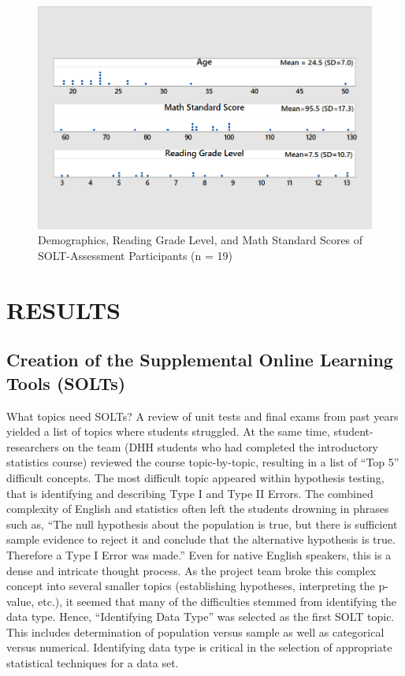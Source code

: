 \documentclass[11.5pt]{sig-alternate} %
\begin{document}
\begin{large}
\begin{figure}[h]
    \centering
    \includegraphics[width=1\linewidth]{Fig_2b.png}
    \caption{Demographics, Reading Grade Level, and Math Standard Scores of SOLT-Assessment Participants (n = 19)}
\end{figure}

\section*{RESULTS}

\subsection*{Creation of the Supplemental Online Learning Tools (SOLTs)}

What topics need SOLTs? A review of unit tests and final exams from past years yielded a list of topics where students struggled. At the same time, student-researchers on the team (DHH students who had completed the introductory statistics course) reviewed the course topic-by-topic, resulting in a list of “Top 5” difficult concepts. The most difficult topic appeared within hypothesis testing, that is identifying and describing Type I and Type II Errors. The combined complexity of English and statistics often left the students drowning in phrases such as, “The null hypothesis about the population is true, but there is sufficient sample evidence to reject it and conclude that the alternative hypothesis is true. Therefore a Type I Error was made.” Even for native English speakers, this is a dense and intricate thought process. As the project team broke this complex concept into several smaller topics (establishing hypotheses, interpreting the p-value, etc.), it seemed that many of the difficulties stemmed from identifying the data type. Hence, “Identifying Data Type” was selected as the first SOLT topic. This includes determination of population versus sample as well as categorical versus numerical. Identifying data type is critical in the selection of appropriate statistical techniques for a data set.


\end{large}
\end{document}
